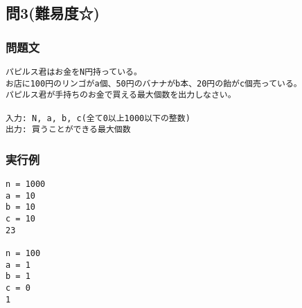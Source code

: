 \subsection{問3(難易度☆)}
\subsubsection{問題文}
\begin{verbatim}
パピルス君はお金をN円持っている。
お店に100円のリンゴがa個、50円のバナナがb本、20円の飴がc個売っている。
パピルス君が手持ちのお金で買える最大個数を出力しなさい。

入力: N, a, b, c(全て0以上1000以下の整数)
出力: 買うことができる最大個数
\end{verbatim}

\subsubsection{実行例}
\begin{verbatim}
n = 1000
a = 10
b = 10
c = 10
23

n = 100
a = 1
b = 1
c = 0
1
\end{verbatim}
